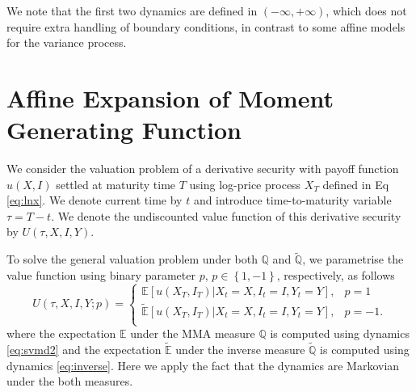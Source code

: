 \documentclass[pdftex,11pt,a4paper] {article}
\begin{document}
We note that the first two dynamics are defined in $(-\infty, +\infty)$, which does not require extra handling of boundary conditions, in contrast to some affine models for the variance process. 








\section{Affine Expansion of Moment Generating Function}\label{sec:affine_expansion}

We consider the valuation problem of a derivative security with payoff function $u(X,I)$ settled at maturity time $T$ using log-price process $X_{T}$ defined in Eq \eqref{eq:lnx}. We denote current time by $t$ and introduce time-to-maturity variable $\tau=T-t$. We denote the undiscounted value function of this derivative security by $U(\tau,X,I,Y)$.

To solve the general valuation problem under both $\mathbb{Q}$ and $\tilde{\mathbb{Q}}$, we parametrise the value function using binary parameter $p$, $p\in\left\{1,-1\right\}$, respectively, as follows
\begin{equation} \label{eq:val}
U(\tau,X,I,Y; p) = 
\begin{cases}
\mathbb{E}[u(X_T,I_T)\left.\right|X_t=X, I_t=I, Y_t=Y], & p=1\\
\tilde{\mathbb{E}}[u(X_T,I_T)\left.\right|X_t=X, I_t=I, Y_t=Y], & p=-1.\\
\end{cases}
\end{equation}
where the expectation $\mathbb{E}$ under the MMA measure $\mathbb{Q}$ is computed using  dynamics \eqref{eq:svmd2} and the expectation $\tilde{\mathbb{E}}$ under the inverse measure $\tilde{\mathbb{Q}}$ is computed using dynamics \eqref{eq:inverse}. Here we apply the fact that the dynamics are Markovian under the both measures.
\end{document}
